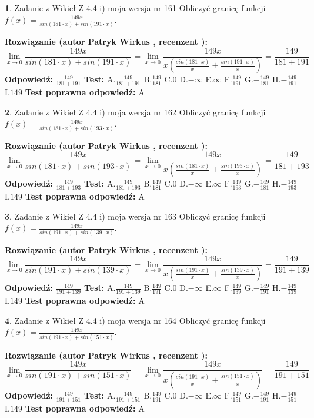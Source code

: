\documentclass[12pt, a4paper]{article}
\theoremstyle{definition} %
\newtheorem{zad}{}
\newcommand{\zadStart}[1]{\begin{zad}#1\newline}
\newcommand{\zadStop}{\end{zad}}
\newcommand{\rozwStart}[2]{\noindent \textbf{Rozwiązanie (autor #1 , recenzent #2): }\newline}
\newcommand{\rozwStop}{\newline}
\newcommand{\odpStart}{\noindent \textbf{Odpowiedź:}\newline}
\newcommand{\odpStop}{\newline}
\newcommand{\testStart}{\noindent \textbf{Test:}\newline}
\newcommand{\testStop}{\newline}
\newcommand{\kluczStart}{\noindent \textbf{Test poprawna odpowiedź:}\newline}
\newcommand{\kluczStop}{\newline}
\begin{document}
\zadStart{Zadanie z Wikieł Z 4.4 i) moja wersja nr 161}
Obliczyć granicę funkcji $f(x)=\frac{149x}{sin(181\cdot x) +sin(191\cdot x)}$.
\zadStop
\rozwStart{Patryk Wirkus}{}
$$\lim\limits_{x\to 0}\frac{149x}{sin(181\cdot x) +sin(191\cdot x)}=\lim\limits_{x\to 0}\frac{149x}{x(\frac{sin(181\cdot x)}{x}+\frac{sin(191\cdot x)}{x})}=\frac{149}{181+191}$$
\rozwStop
\odpStart
$\frac{149}{181+191}$
\odpStop
\testStart
A.$\frac{149}{181+191}$
B.$\frac{149}{181}$
C.$0$
D.$-\infty$
E.$\infty$
F.$\frac{149}{191}$
G.$-\frac{149}{181}$
H.$-\frac{149}{191}$
I.$149$
\testStop
\kluczStart
A
\kluczStop



\zadStart{Zadanie z Wikieł Z 4.4 i) moja wersja nr 162}
Obliczyć granicę funkcji $f(x)=\frac{149x}{sin(181\cdot x) +sin(193\cdot x)}$.
\zadStop
\rozwStart{Patryk Wirkus}{}
$$\lim\limits_{x\to 0}\frac{149x}{sin(181\cdot x) +sin(193\cdot x)}=\lim\limits_{x\to 0}\frac{149x}{x(\frac{sin(181\cdot x)}{x}+\frac{sin(193\cdot x)}{x})}=\frac{149}{181+193}$$
\rozwStop
\odpStart
$\frac{149}{181+193}$
\odpStop
\testStart
A.$\frac{149}{181+193}$
B.$\frac{149}{181}$
C.$0$
D.$-\infty$
E.$\infty$
F.$\frac{149}{193}$
G.$-\frac{149}{181}$
H.$-\frac{149}{193}$
I.$149$
\testStop
\kluczStart
A
\kluczStop



\zadStart{Zadanie z Wikieł Z 4.4 i) moja wersja nr 163}
Obliczyć granicę funkcji $f(x)=\frac{149x}{sin(191\cdot x) +sin(139\cdot x)}$.
\zadStop
\rozwStart{Patryk Wirkus}{}
$$\lim\limits_{x\to 0}\frac{149x}{sin(191\cdot x) +sin(139\cdot x)}=\lim\limits_{x\to 0}\frac{149x}{x(\frac{sin(191\cdot x)}{x}+\frac{sin(139\cdot x)}{x})}=\frac{149}{191+139}$$
\rozwStop
\odpStart
$\frac{149}{191+139}$
\odpStop
\testStart
A.$\frac{149}{191+139}$
B.$\frac{149}{191}$
C.$0$
D.$-\infty$
E.$\infty$
F.$\frac{149}{139}$
G.$-\frac{149}{191}$
H.$-\frac{149}{139}$
I.$149$
\testStop
\kluczStart
A
\kluczStop



\zadStart{Zadanie z Wikieł Z 4.4 i) moja wersja nr 164}
Obliczyć granicę funkcji $f(x)=\frac{149x}{sin(191\cdot x) +sin(151\cdot x)}$.
\zadStop
\rozwStart{Patryk Wirkus}{}
$$\lim\limits_{x\to 0}\frac{149x}{sin(191\cdot x) +sin(151\cdot x)}=\lim\limits_{x\to 0}\frac{149x}{x(\frac{sin(191\cdot x)}{x}+\frac{sin(151\cdot x)}{x})}=\frac{149}{191+151}$$
\rozwStop
\odpStart
$\frac{149}{191+151}$
\odpStop
\testStart
A.$\frac{149}{191+151}$
B.$\frac{149}{191}$
C.$0$
D.$-\infty$
E.$\infty$
F.$\frac{149}{151}$
G.$-\frac{149}{191}$
H.$-\frac{149}{151}$
I.$149$
\testStop
\kluczStart
A
\kluczStop
\end{document}
